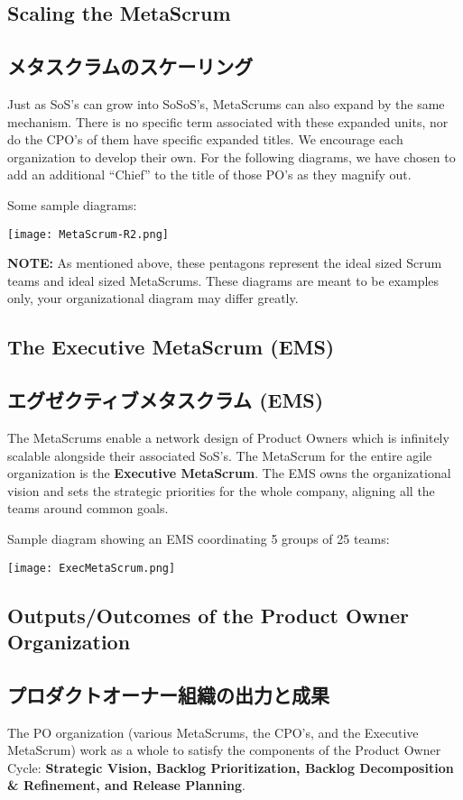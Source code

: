 \documentclass[12pt,a4paper,parskip=full]{scrartcl}
\begin{document}
\subsection{Scaling the MetaScrum}
\fi
\subsection{メタスクラムのスケーリング}
Just as SoS's can grow into SoSoS's, MetaScrums can also expand by the same
mechanism. There is no specific term associated with these expanded units,
nor do the CPO's of them have specific expanded titles. We encourage each
organization to develop their own. For the following diagrams, we have
chosen to add an additional ``Chief'' to the title of those PO's as they
magnify out.

Some sample diagrams:

\texttt{[image: MetaScrum-R2.png]}

\textbf{NOTE:} As mentioned above, these pentagons represent the ideal
sized Scrum teams and ideal sized MetaScrums. These diagrams are meant to
be examples only, your organizational diagram may differ greatly.

\subsection{The Executive MetaScrum (EMS)}
\fi
\subsection{エグゼクティブメタスクラム (EMS)}
The MetaScrums enable a network design of Product Owners which is
infinitely scalable alongside their associated SoS's. The MetaScrum for the
entire agile organization is the \textbf{Executive MetaScrum}. The EMS owns
the organizational vision and sets the strategic priorities for the whole
company, aligning all the teams around common goals.

Sample diagram showing an EMS coordinating 5 groups of 25 teams:

\texttt{[image: ExecMetaScrum.png]}

\subsection{Outputs/Outcomes of the Product Owner Organization}
\fi
\subsection{プロダクトオーナー組織の出力と成果}
The PO organization (various MetaScrums, the CPO's, and the Executive
MetaScrum) work as a whole to satisfy the components of the Product Owner
Cycle: \textbf{Strategic Vision, Backlog Prioritization, Backlog
Decomposition \& Refinement, and Release Planning}.
\end{document}
